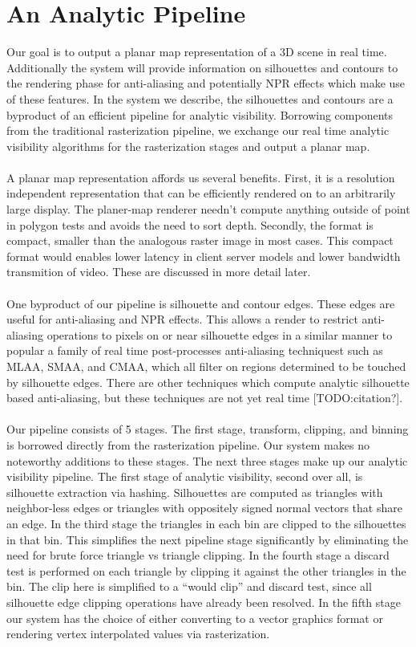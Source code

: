 \documentclass[review]{acmsiggraph}
\begin{document}
\section{An Analytic Pipeline}
Our goal is to output a planar map representation of a 3D scene in real time. Additionally the system will provide information on silhouettes and contours to the rendering phase for anti-aliasing and potentially NPR effects which make use of these features. In the system we describe, the silhouettes and contours are a byproduct of an efficient pipeline for analytic visibility. Borrowing components from the traditional rasterization pipeline, we exchange our real time analytic visibility algorithms for the rasterization stages and output a planar map. 
\\\\
A planar map representation affords us several benefits. First, it is a resolution independent representation that can be efficiently rendered on to an arbitrarily large display. The planer-map renderer needn’t compute anything outside of point in polygon tests and avoids the need to sort depth. Secondly, the format is compact, smaller than the analogous raster image in most cases. This compact format would enables lower latency in client server models and lower bandwidth transmition of video.  These are discussed in more detail later. 
\\\\
One byproduct of our pipeline is silhouette and contour edges. These edges are useful for anti-aliasing and NPR effects. This allows a render to restrict anti-aliasing operations to pixels on or near silhouette edges in a similar manner to popular a family of real time post-processes anti-aliasing techniquest such as MLAA, SMAA, and CMAA, which all filter on regions determined to be touched by silhouette edges. There are other techniques which compute analytic silhouette based anti-aliasing, but these techniques are not yet real time [TODO:citation?].
\\\\
Our pipeline consists of 5 stages. The first stage, transform, clipping, and binning is borrowed directly from the rasterization pipeline. Our system makes no noteworthy additions to these stages. The next three stages make up our analytic visibility pipeline. The first stage of analytic visibility, second over all, is silhouette extraction via hashing. Silhouettes are computed as triangles with neighbor-less edges or triangles with oppositely signed normal vectors that share an edge. In the third stage the triangles in each bin are clipped to the silhouettes in that bin.  This simplifies the next pipeline stage significantly by eliminating the need for brute force triangle vs triangle clipping. In the fourth stage a discard test is performed on each triangle by clipping it against the other triangles in the bin. The clip here is simplified to a “would clip” and discard test, since all silhouette edge clipping operations have already been resolved. In the fifth stage our system has the choice of either converting to a vector graphics format or rendering vertex interpolated values via rasterization.
\end{document}
